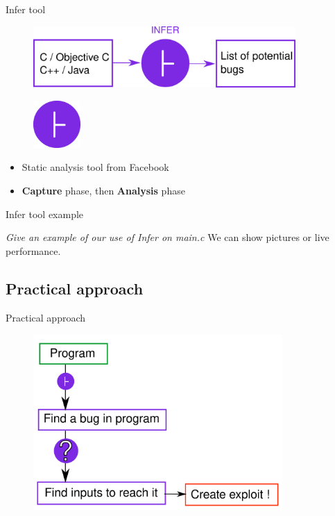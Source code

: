 \documentclass{beamer}
\begin{document}
\begin{frame}{Infer tool}

\begin{figure}
\includegraphics[width=10cm]{Figures/InferDrawing.png}
\end{figure}

\end{frame}

\begin{frame}

\begin{figure}
\includegraphics[width = 1.8cm]{Figures/InferLogo.png}

\end{figure}

\vspace{1cm}

\begin{itemize}
\item Static analysis tool from Facebook
\item \textbf{Capture} phase, then \textbf{Analysis} phase
\end{itemize}

\end{frame}

\begin{frame}{Infer tool example}

\textit{Give an example of our use of Infer on main.c}
We can show pictures or live performance.
\end{frame}

\subsection{Practical approach}

\begin{frame}{Practical approach}

\begin{figure}
\includegraphics[width=9.5cm]{Figures/Workflow.png}
\end{figure}

\end{frame}
\end{document}
